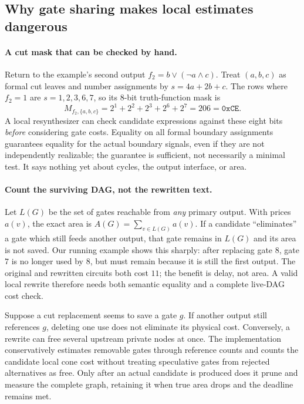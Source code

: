 \documentclass[a4paper,10pt]{article}
\theoremstyle{definition}
\theoremstyle{remark}
\begin{document}
\subsection{Why gate sharing makes local estimates dangerous}
\paragraph{A cut mask that can be checked by hand.} Return to the example's second output $f_2=b\lor(\neg a\land c)$. Treat $(a,b,c)$ as formal cut leaves and number assignments by $s=4a+2b+c$. The rows where $f_2=1$ are $s=1,2,3,6,7$, so its 8-bit truth-function mask is
\[
 M_{f_2,\{a,b,c\}}=2^1+2^2+2^3+2^6+2^7=206=\texttt{0xCE}.
\]
A local resynthesizer can check candidate expressions against these eight bits \emph{before} considering gate costs. Equality on all formal boundary assignments guarantees equality for the actual boundary signals, even if they are not independently realizable; the guarantee is sufficient, not necessarily a minimal test. It says nothing yet about cycles, the output interface, or area.

\paragraph{Count the surviving DAG, not the rewritten text.} Let $L(G)$ be the set of gates reachable from \emph{any} primary output. With prices $a(v)$, the exact area is $A(G)=\sum_{v\in L(G)}a(v)$. If a candidate ``eliminates'' a gate which still feeds another output, that gate remains in $L(G)$ and its area is not saved. Our running example shows this sharply: after replacing gate $8$, gate $7$ is no longer used by $8$, but must remain because it is still the first output. The original and rewritten circuits both cost $11$; the benefit is delay, not area. A valid local rewrite therefore needs both semantic equality and a complete live-DAG cost check.

Suppose a cut replacement seems to save a gate $g$. If another output still references $g$, deleting one use does not eliminate its physical cost. Conversely, a rewrite can free several upstream private nodes at once. The implementation conservatively estimates removable gates through reference counts and counts the candidate local cone cost without treating speculative gates from rejected alternatives as free. Only after an actual candidate is produced does it prune and measure the complete graph, retaining it when true area drops and the deadline remains met.
\end{document}
